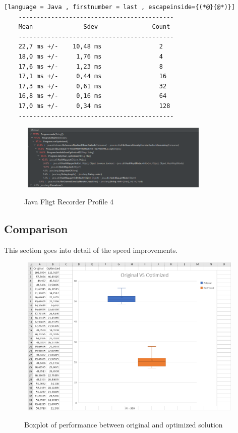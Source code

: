 \begin{lstlisting}[language = Java , firstnumber = last , escapeinside={(*@}{@*)}]
    -------------------------------------------
    Mean              Sdev               Count
    -------------------------------------------
    22,7 ms +/-    10,48 ms                2
    18,0 ms +/-     1,76 ms                4
    17,6 ms +/-     1,23 ms                8
    17,1 ms +/-     0,44 ms                16
    17,3 ms +/-     0,61 ms                32
    16,8 ms +/-     0,16 ms                64
    17,0 ms +/-     0,34 ms                128
    -------------------------------------------
\end{lstlisting}

\begin{figure}[H]
    \centering\
    \includegraphics[width = 0.8\textwidth ]{figures/profile4.PNG}
    \caption{Java Fligt Recorder Profile 4}
    \label{fig:p4}
\end{figure}

\subsection{Comparison}
\label{sec:2.7}
This section goes into detail of the speed improvements.

\begin{figure}[H]
    \centering\
    \includegraphics[width = 0.95\textwidth ]{figures/boxplots.png}
    \caption{Boxplot of performance between original and optimized solution}
    \label{fig:boxplots}
\end{figure}

